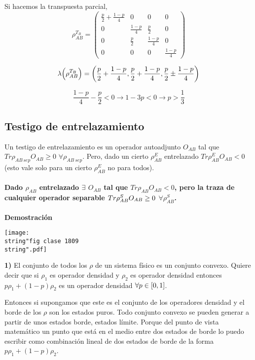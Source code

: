 Si hacemos la transpuesta parcial, 
\[
\rho_{AB}^{T_{B}}=\left(\begin{array}{cccc}
\frac{p}{2}+\frac{1-p}{4} & 0 & 0 & 0\\
0 & \frac{1-p}{4} & \frac{p}{2} & 0\\
0 & \frac{p}{2} & \frac{1-p}{4} & 0\\
0 & 0 & 0 & \frac{1-p}{4}
\end{array}\right)
\]

\[
\lambda\PARENTESIS{\rho_{AB}^{T_{B}}}=\PARENTESIS{\frac{p}{2}+\frac{1-p}{4},\frac{p}{2}+\frac{1-p}{4},\frac{p}{2}\pm\frac{1-p}{4}}
\]

\[
\frac{1-p}{4}-\frac{p}{2}<0\rightarrow1-3p<0\rightarrow p>\frac{1}{3}
\]
\subsection{Testigo de entrelazamiento}

Un testigo de entrelazamiento es un operador autoadjunto $O_{AB}$
tal que $Tr\rho_{AB\,sep}O_{AB}\geq0$ $\forall\rho_{AB\:sep}$. Pero,
dado un cierto $\rho_{AB}^{E}$ entrelazado $Tr\rho_{AB}^{E}O_{AB}<0$
(esto vale solo para un cierto $\rho_{AB}^{E}$ no para todos).

\paragraph{Dado $\rho_{AB}$ entrelazado $\exists$ $O_{AB}$ tal que $Tr\rho_{AB}O_{AB}<0$,
pero la traza de cualquier operador separable $Tr\rho_{AB}^{S}O_{AB}\protect\geq0$
$\forall\rho_{AB}^{S}$. }

\textbf{Demostración}
\begin{center}
\texttt{[image: \\string"fig clase 1809\\string".pdf]}
\par
\end{center}

\textbf{1) }El conjunto de todos los $\rho$ de un sistema físico
es un conjunto convexo. Quiere decir que si $\rho_{1}$ es operador
densidad y $\rho_{2}$ es operador densidad entonces $p\rho_{1}+(1-p)\rho_{2}$
es un operador densidad $\forall p\in\CORCHETES{0,1}$. 

Entonces si supongamos que este es el conjunto de los operadores densidad
y el borde de los $\rho$ son los estados puros. Todo conjunto convexo
se pueden generar a partir de unos estados borde, estados límite.
Porque del punto de vista matemático un punto que está en el medio
entre dos estados de borde lo puedo escribir como combinación lineal
de dos estados de borde de la forma $p\rho_{1}+(1-p)\rho_{2}$.

